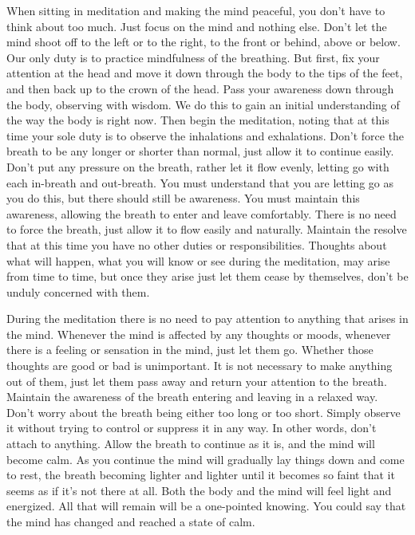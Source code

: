 
When sitting in meditation and making the mind peaceful, you don't have to think about too much. Just focus on the mind and nothing else. Don't let the mind shoot off to the left or to the right, to the front or behind, above or below. Our only duty is to practice mindfulness of the breathing. But first, fix your attention at the head and move it down through the body to the tips of the feet, and then back up to the crown of the head. Pass your awareness down through the body, observing with wisdom. We do this to gain an initial understanding of the way the body is right now. Then begin the meditation, noting that at this time your sole duty is to observe the inhalations and exhalations. Don't force the breath to be any longer or shorter than normal, just allow it to continue easily. Don't put any pressure on the breath, rather let it flow evenly, letting go with each in-breath and out-breath. You must understand that you are letting go as you do this, but there should still be awareness. You must maintain this awareness, allowing the breath to enter and leave comfortably. There is no need to force the breath, just allow it to flow easily and naturally. Maintain the resolve that at this time you have no other duties or responsibilities. Thoughts about what will happen, what you will know or see during the meditation, may arise from time to time, but once they arise just let them cease by themselves, don't be unduly concerned with them.

During the meditation there is no need to pay attention to anything that arises in the mind. Whenever the mind is affected by any thoughts or moods, whenever there is a feeling or sensation in the mind, just let them go. Whether those thoughts are good or bad is unimportant. It is not necessary to make anything out of them, just let them pass away and return your attention to the breath. Maintain the awareness of the breath entering and leaving in a relaxed way. Don't worry about the breath being either too long or too short. Simply observe it without trying to control or suppress it in any way. In other words, don't attach to anything. Allow the breath to continue as it is, and the mind will become calm. As you continue the mind will gradually lay things down and come to rest, the breath becoming lighter and lighter until it becomes so faint that it seems as if it's not there at all. Both the body and the mind will feel light and energized. All that will remain will be a one-pointed knowing. You could say that the mind has changed and reached a state of calm.


